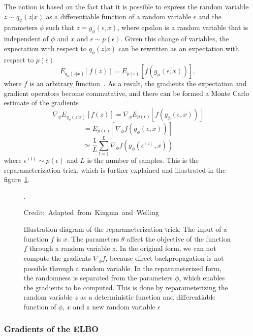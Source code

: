 The notion is based on the fact that it is possible to express the random variable $z \sim q_{\phi}(z|x)$ as a differentiable function of a random variable $\epsilon$ and the parameters $\phi$ such that $z = g_{\phi}(\epsilon, x)$, where epsilon is a random variable that is independent of $\phi$ and $x$ and $\epsilon \sim p(\epsilon)$. Given this change of variables, the expectation with respect to $q_{\phi}(z|x)$ can be rewritten as an expectation with respect to $p(\epsilon)$
\[ E_{q_{\phi}(z|x)}[f(z)] = E_{p(\epsilon)}[f(g_{\phi}(\epsilon, x))], \]
where $f$ is an arbitrary function~\cite{Kingma_2019}.
As a result, the gradients the expectation and gradient operators become commutative, and there can be formed a Monte Carlo estimate of the gradients
\[ \nabla_{\phi} E_{q_{\phi}(z|x)}[f(z)] = \nabla_{\phi} E_{p(\epsilon)}[ f(g_{\phi}(\epsilon, x))] \]
\[ = E_{p(\epsilon)}[\nabla_{\phi} f(g_{\phi}(\epsilon, x))] \]
\[  \simeq \frac{1}{L} \sum_{l=1}^{L} \nabla_{\phi} f(g_{\phi}(\epsilon^{(l)}, x)) \]
where $\epsilon^{(l)} \sim p(\epsilon)$ and $L$ is the number of samples.
This is the reparameterization trick, which is further explained and illustrated in the figure~\ref{reparametrization}.

\begin{figure}
    \centering
    
    \caption[Illustration diagram of the reparameterization trick]%
    {Illustration diagram of the reparameterization trick. The input of a function $f$ is $x$. The parameters $\theta$ affect the objective of the function $f$ through a random variable $z$. In the original form, we can not compute the gradients $\nabla_{\phi} f$, because direct backpropagation is not possible through a random variable. In the reparameterized form, the randomness is separated from the parameters $\phi$, which enables the gradients to be computed. This is done by reparameterizing the random variable $z$ as a deterministic function and differentiable function of $\phi$, $x$ and a new random variable $\epsilon$~\cite{Kingma_2019}}.

    \hspace*{15pt}\hbox{\scriptsize Credit: Adapted from Kingma and Welling\cite{Kingma_2019}  }\label{reparametrization}

\end{figure}

\subsubsection{Gradients of the ELBO}

